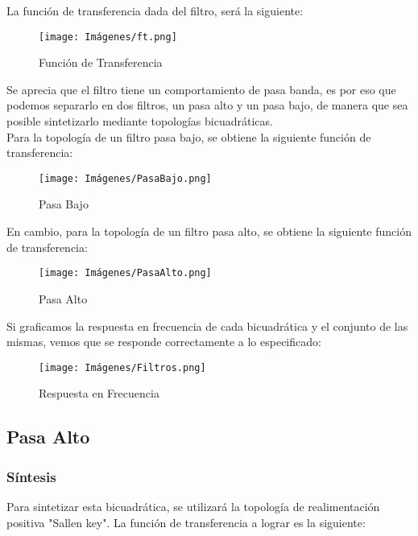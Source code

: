     La función de transferencia dada del filtro, será la siguiente:\\

    \begin{figure}[ht]
        \centering
        \texttt{[image: Imágenes/ft.png]}
        \caption{Función de Transferencia}
    \end{figure} 

    Se aprecia que el filtro tiene un comportamiento de pasa banda, es por eso que podemos separarlo en dos filtros, un pasa alto y un pasa bajo, de manera que sea posible sintetizarlo mediante topologías bicuadráticas.\\

    Para la topología de un filtro pasa bajo, se obtiene la siguiente función de transferencia:\\
    \begin{figure}[ht]
        \centering
        \texttt{[image: Imágenes/PasaBajo.png]}
        \caption{Pasa Bajo}
    \end{figure} 

    En cambio, para la topología de un filtro pasa alto, se obtiene la siguiente función de transferencia:\\
    \begin{figure}[ht]
        \centering
        \texttt{[image: Imágenes/PasaAlto.png]}
        \caption{Pasa Alto}
    \end{figure} 

    \newpage
    Si graficamos la respuesta en frecuencia de cada bicuadrática y el conjunto de las mismas, vemos que se responde correctamente a lo especificado:\\
    \begin{figure}[ht]
        \centering
        \texttt{[image: Imágenes/Filtros.png]}
        \caption{Respuesta en Frecuencia}
    \end{figure}

    \newpage
    \subsection{Pasa Alto}
    \subsubsection{Síntesis}
    Para sintetizar esta bicuadrática, se utilizará la topología de realimentación positiva "Sallen key". La función de transferencia a lograr es la siguiente:\\

